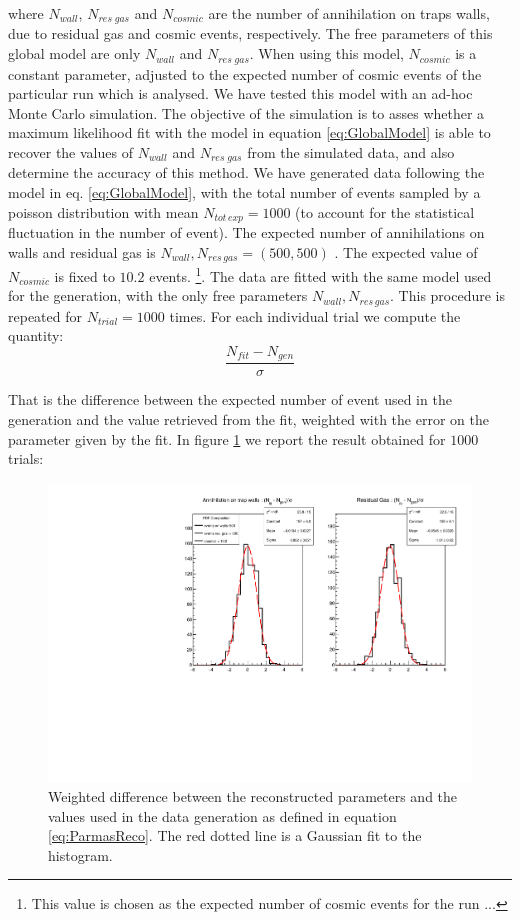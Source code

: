 \documentclass[11pt,a4paper,oneside]{article}
\begin{document}
where $N_{wall}$, $N_ {res \; gas}$ and $N_{cosmic}$ are the number of annihilation on traps walls, due to residual gas and cosmic events, respectively.
The free parameters of this global model are only $N_{wall}$ and $N_{res \; gas}$. When using this model, $N_{cosmic}$ is a constant parameter, adjusted to the expected number of cosmic events of the particular run which is analysed.
We have tested this model with an ad-hoc Monte Carlo simulation. The objective of the simulation is to asses whether a maximum likelihood fit with the model in equation \ref{eq:GlobalModel} is able to recover the values of $N_{wall}$ and $N_{res \; gas}$ from the simulated data, and also determine the accuracy of this method. 
We have generated data following the model in eq. \ref{eq:GlobalModel}, with the total number of events sampled by a poisson distribution with mean $N_{tot \, exp} = 1000$ (to account for the statistical fluctuation in the number of event). The expected number of annihilations on walls and residual gas is $N_{wall} , N_{res \, gas} = (500,500)$ . The expected value of $N_{cosmic}$ is fixed to $10.2$ events. \footnote{ This value is chosen as the expected number of cosmic events for the run ...}.
The data are fitted with the same model used for the generation, with the only free parameters $N_{wall} , N_{res \, gas}$. This procedure is repeated for $N_{trial} = 1000$ times. For each individual trial we compute the quantity:
\begin{equation} \label{eq:ParmasReco}
\dfrac{N_{fit} - N_{gen}}{\sigma}
\end{equation}

That is the difference between the expected number of event used in the generation and the value retrieved from the fit, weighted with the error on the parameter given by the fit. In figure \ref{fig:ReconstructedParameters} we report the result obtained for $1000$ trials: 

\begin{figure}[hbtp]
\centering
\includegraphics[width = \textwidth]{../ALPHA-2/PlotMLEfit/N1000/Reconstruced_(500,500).pdf}
\caption{Weighted difference between the reconstructed parameters and the values used in the data generation as defined in equation \ref{eq:ParmasReco}. The red dotted line is a Gaussian fit to the histogram.}
\label{fig:ReconstructedParameters}
\end{figure}
\end{document}
